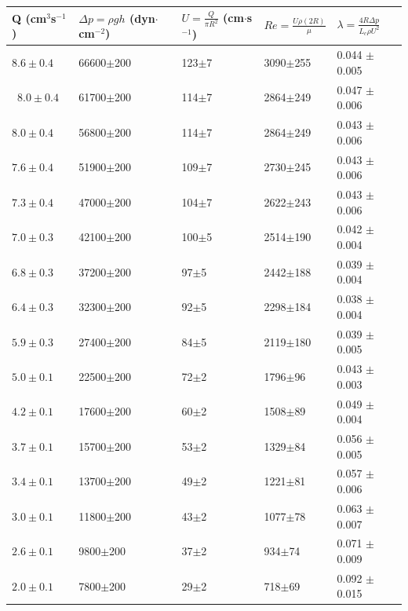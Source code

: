 	
	\begin{table}[H]
		\begin{minipage}{\textwidth}
			\centering
			\begin{tabular}{|C{1.8cm}|C{2cm}|C{2.5cm}|w{c}{2.5cm}|C{2.5cm}|}
				\toprule
				\toprule
				Q (cm$^3$s$^{-1}$) &
				$\Delta p = \rho g h$ { }(dyn$\cdot$cm$^{-2}$)  &
				$U = \frac{Q}{\pi R^2}$ (cm$\cdot$s$^{-1}$) &
				$Re = \frac{U\rho(2R)}{\mu}$& 
				$\lambda = \frac{4 R \Delta p}{L_c \rho U^2}$ \\
				\bottomrule
				\bottomrule
				$8.6 \pm 0.4$  & 66600$\pm$200 &    123$\pm$7  & 3090$\pm$255 &0.044 $\pm$ 0.005 \\\
				$8.0 \pm 0.4$  & 61700$\pm$200 &    114$\pm$7  & 2864$\pm$249 &0.047 $\pm$ 0.006 \\
				$8.0 \pm 0.4$  & 56800$\pm$200 &    114$\pm$7  & 2864$\pm$249 &0.043 $\pm$ 0.006 \\
				$7.6 \pm 0.4$  & 51900$\pm$200 &    109$\pm$7  & 2730$\pm$245 &0.043 $\pm$ 0.006 \\
				$7.3 \pm 0.4$  & 47000$\pm$200 &    104$\pm$7  & 2622$\pm$243 &0.043 $\pm$ 0.006 \\
				$7.0 \pm 0.3$  & 42100$\pm$200 &    100$\pm$5  & 2514$\pm$190 &0.042 $\pm$ 0.004 \\
				$6.8 \pm 0.3$  & 37200$\pm$200 &     97$\pm$5   & 2442$\pm$188&0.039 $\pm$ 0.004 \\
				$6.4 \pm 0.3$  & 32300$\pm$200 &  	 92$\pm$5  & 2298$\pm$184 & 0.038 $\pm$ 0.004 \\
				$5.9 \pm 0.3$  & 27400$\pm$200 &     84$\pm$5  & 2119$\pm$180 &0.039 $\pm$ 0.005 \\
				$5.0 \pm 0.1$  & 22500$\pm$200 &     72$\pm$2  & 1796$\pm$96  &0.043 $\pm$ 0.003 \\
				$4.2 \pm 0.1$  & 17600$\pm$200 &     60$\pm$2  & 1508$\pm$89  &0.049 $\pm$ 0.004 \\
				$3.7 \pm 0.1$  & 15700$\pm$200 &     53$\pm$2  & 1329$\pm$84  &0.056 $\pm$ 0.005 \\
				$3.4 \pm 0.1$  & 13700$\pm$200 &     49$\pm$2  & 1221$\pm$81  &0.057 $\pm$ 0.006 \\
				$3.0 \pm 0.1$  & 11800$\pm$200 &     43$\pm$2  & 1077$\pm$78  &0.063 $\pm$ 0.007 \\
				$2.6 \pm 0.1$  &  9800$\pm$200 &     37$\pm$2  &  934$\pm$74  &0.071 $\pm$ 0.009 \\
				$2.0 \pm 0.1$  &  7800$\pm$200 &     29$\pm$2  &  718$\pm$69  &0.092 $\pm$ 0.015 \\

\end{tabular}
\end{minipage}
\end{table}
